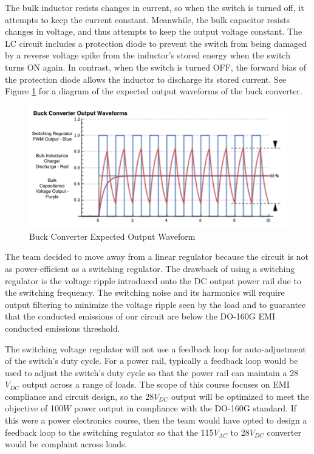 \documentclass[conference]{IEEEtran}
\begin{document}
The bulk inductor resists changes in current, so when the switch is turned off, it attempts to keep the current constant. Meanwhile, the bulk capacitor resists changes in voltage, and thus attempts to keep the output voltage constant. The LC circuit includes a protection diode to prevent the switch from being damaged by a reverse voltage spike from the inductor's stored energy when the switch turns ON again. In contrast, when the switch is turned OFF, the forward bias of the protection diode allows the inductor to discharge its stored current. See Figure \ref{fig:buck_converter_waveform_diagram} for a diagram of the expected output waveforms of the buck converter.

\begin{figure}[htp]
    \centering
    \includegraphics[width=1.0\linewidth]{buck_converter_waveform.png}
    \caption{Buck Converter Expected Output Waveform}
    \label{fig:buck_converter_waveform_diagram}
\end{figure}

The team decided to move away from a linear regulator because the circuit is not as power-efficient as a switching regulator. The drawback of using a switching regulator is the voltage ripple introduced onto the DC output power rail due to the switching frequency. The switching noise and its harmonics will require output filtering to minimize the voltage ripple seen by the load and to guarantee that the conducted emissions of our circuit are below the DO-160G EMI conducted emissions threshold. 

The switching voltage regulator will not use a feedback loop for auto-adjustment of the switch's duty cycle. For a power rail, typically a feedback loop would be used to adjust the switch's duty cycle so that the power rail can maintain a 28$V_{DC}$ output across a range of loads. The scope of this course focuses on EMI compliance and circuit design, so the 28$V_{DC}$ output will be optimized to meet the objective of 100$W$ power output in compliance with the DO-160G standard. If this were a power electronics course, then the team would have opted to design a feedback loop to the switching regulator so that the 115$V_{AC}$ to 28$V_{DC}$ converter would be complaint across loads.
\end{document}
